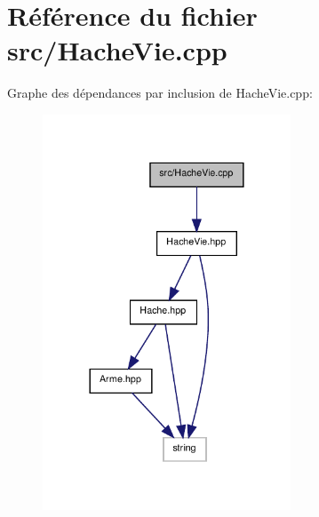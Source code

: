 \section{Référence du fichier src/\-Hache\-Vie.cpp}
\label{_hache_vie_8cpp}
Graphe des dépendances par inclusion de Hache\-Vie.\-cpp\-:\nopagebreak
\begin{figure}[H]
\begin{center}
\leavevmode
\includegraphics[width=209pt]{_hache_vie_8cpp__incl}
\end{center}
\end{figure}
